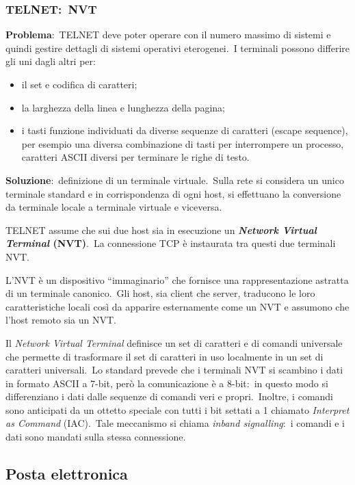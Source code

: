 \subsubsection{TELNET:\ NVT}

\textbf{Problema}:\ TELNET deve poter operare con il numero massimo di sistemi e quindi gestire dettagli di sistemi operativi eterogenei.\
I terminali possono differire gli uni dagli altri per:
\begin{itemize}
    \item il set e codifica di caratteri;
    \item la larghezza della linea e lunghezza della pagina;
    \item i tasti funzione individuati da diverse sequenze di caratteri (escape sequence), per esempio una diversa combinazione di tasti per interrompere un processo, caratteri ASCII diversi per terminare le righe di testo.
\end{itemize}
\textbf{Soluzione}:\ definizione di un terminale virtuale.\
Sulla rete si considera un unico terminale standard e in corrispondenza di ogni host, si effettuano la conversione da terminale locale a terminale virtuale e viceversa.

TELNET assume che sui due host sia in esecuzione un \textbf{\emph{Network Virtual Terminal} (NVT)}.\
La connessione TCP è instaurata tra questi due terminali NVT.

L'NVT è un dispositivo ``immaginario'' che fornisce una rappresentazione astratta di un terminale canonico.\
Gli host, sia client che server, traducono le loro caratteristiche locali così da apparire esternamente come un NVT e assumono che l'host remoto sia un NVT.

Il \emph{Network Virtual Terminal} definisce un set di caratteri e di comandi universale che permette di trasformare il set di caratteri in uso localmente in un set di caratteri universali.\
Lo standard prevede che i terminali NVT si scambino i dati in formato ASCII a 7-bit, però la comunicazione è a 8-bit:\ in questo modo si differenziano i dati dalle sequenze di comandi veri e propri.\
Inoltre, i comandi sono anticipati da un ottetto speciale con tutti i bit settati a 1 chiamato \emph{Interpret as Command} (IAC).\
Tale meccanismo si chiama \emph{inband signalling}:\ i comandi e i dati sono mandati sulla stessa connessione.

\subsection{Posta elettronica}

